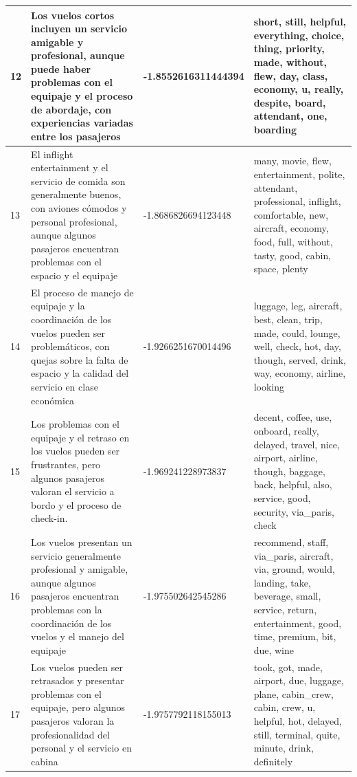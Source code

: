 \documentclass{report}
\begin{document}
{{\begin{longtable}{|p{1cm}|p{4cm}|p{4cm}|p{6cm}|}
                    \hline
                    12 & Los vuelos cortos incluyen un servicio amigable y profesional, aunque puede haber problemas con el equipaje y el proceso de abordaje, con experiencias variadas entre los pasajeros & -1.8552616311444394 & short, still, helpful, everything, choice, thing, priority, made, without, flew, day, class, economy, u, really, despite, board, attendant, one, boarding \\
                    \hline
                    13 & El inflight entertainment y el servicio de comida son generalmente buenos, con aviones cómodos y personal profesional, aunque algunos pasajeros encuentran problemas con el espacio y el equipaje & -1.8686826694123448 & many, movie, flew, entertainment, polite, attendant, professional, inflight, comfortable, new, aircraft, economy, food, full, without, tasty, good, cabin, space, plenty \\
                    \hline
                    14 & El proceso de manejo de equipaje y la coordinación de los vuelos pueden ser problemáticos, con quejas sobre la falta de espacio y la calidad del servicio en clase económica & -1.9266251670014496 & luggage, leg, aircraft, best, clean, trip, made, could, lounge, well, check, hot, day, though, served, drink, way, economy, airline, looking \\
                    \hline
                    15 & Los problemas con el equipaje y el retraso en los vuelos pueden ser frustrantes, pero algunos pasajeros valoran el servicio a bordo y el proceso de check-in. & -1.969241228973837 & decent, coffee, use, onboard, really, delayed, travel, nice, airport, airline, though, baggage, back, helpful, also, service, good, security, via\_paris, check \\
                    \hline
                    16 & Los vuelos presentan un servicio generalmente profesional y amigable, aunque algunos pasajeros encuentran problemas con la coordinación de los vuelos y el manejo del equipaje & -1.975502642545286 & recommend, staff, via\_paris, aircraft, via, ground, would, landing, take, beverage, small, service, return, entertainment, good, time, premium, bit, due, wine \\
                    \hline
                    17 & Los vuelos pueden ser retrasados y presentar problemas con el equipaje, pero algunos pasajeros valoran la profesionalidad del personal y el servicio en cabina & -1.9757792118155013 & took, got, made, airport, due, luggage, plane, cabin\_crew, cabin, crew, u, helpful, hot, delayed, still, terminal, quite, minute, drink, definitely \\

\end{longtable}}}
\end{document}
